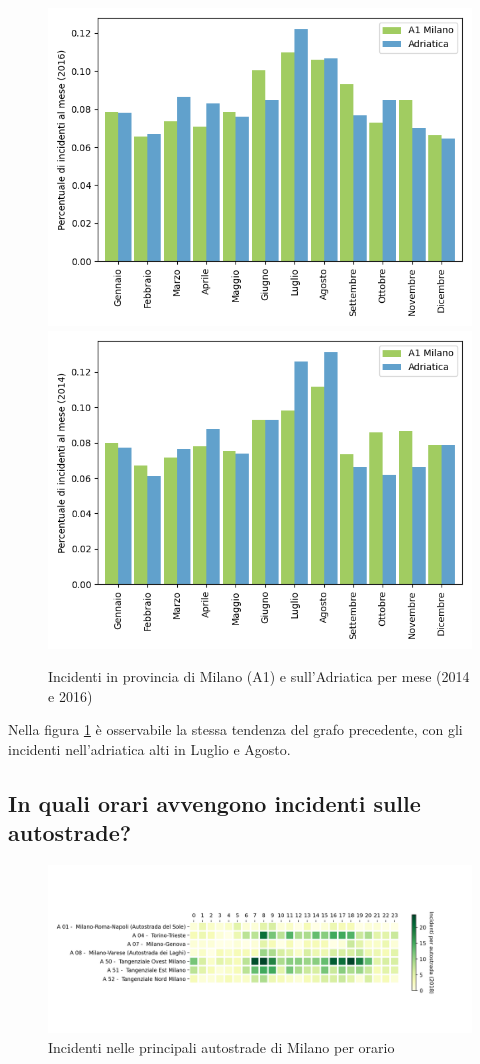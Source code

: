 \documentclass[a4paper]{report}
\begin{document}
\begin{figure}
    \includegraphics[width=0.5\linewidth]{../src/incidenti/incidenti_aci/autostrade/milano_adriatica_2016.png}
    \includegraphics[width=0.5\linewidth]{../src/incidenti/incidenti_aci/autostrade/milano_adriatica_2014.png}
    \caption{Incidenti in provincia di Milano (A1) e sull'Adriatica per mese (2014 e 2016)}
    \label{fig:milano-adriatica_tendenza}
\end{figure}

Nella figura \ref{fig:milano-adriatica_tendenza} è osservabile la stessa tendenza del grafo precedente, 
con gli incidenti nell'adriatica alti in Luglio e Agosto. 

\subsection{In quali orari avvengono incidenti sulle autostrade?}

\begin{figure}
    \includegraphics[width=\linewidth]{../src/incidenti/incidenti_aci/autostrade/tangenziali_autostrade.png}
    \caption{Incidenti nelle principali autostrade di Milano per orario}
    \label{fig:tangenziali-autostrade}
\end{figure}
\end{document}
